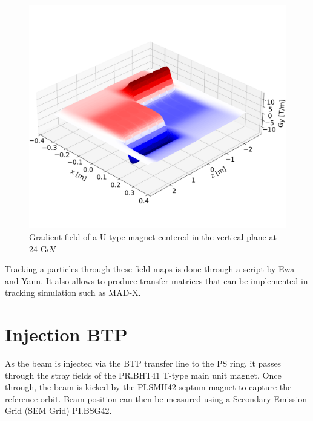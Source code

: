 \documentclass[a4paper,
               biblatex,     %
               keeplastbox,   %
               ]{jacow}
\begin{document}
\begin{figure}[!htb]
   \centering
   \includegraphics*[width=1.0\columnwidth, trim={0 2.0cm 0 4cm},clip]{gradient_field.png}
   \caption{Gradient field of a U-type magnet centered in the vertical plane at 24 GeV}
   \label{fig:gradient_field}
\end{figure}

Tracking a particles through these field maps is done through a script by Ewa and Yann. It also allows to produce transfer matrices that can be implemented in tracking simulation such as MAD-X.

\section{Injection BTP}

As the beam is injected via the BTP transfer line to the PS ring, it passes through the stray fields of the PR.BHT41 T-type main unit magnet. Once through, the beam is kicked by the PI.SMH42 septum magnet to capture the reference orbit. Beam position can then be measured using a Secondary Emission Grid (SEM Grid) PI.BSG42.
\end{document}
